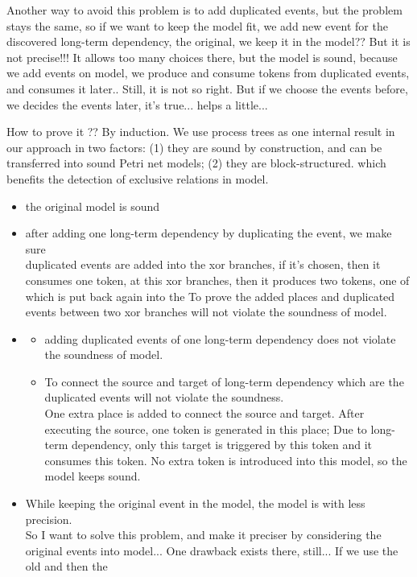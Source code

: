 Another way to avoid this problem is to add duplicated events, but the problem stays the same, so if we want to keep the model fit, we add new event for the discovered long-term dependency, the original, we keep it in the model?? But it is not precise!!! It allows too many choices there, but the model is sound, because we add events on model, we produce and consume tokens from duplicated events, and consumes it later.. Still, it is not so right. But if we choose the events before, we decides the events later, it's true... helps a little... 

How to prove it ?? By induction. 
We use  process  trees as one internal result in  our  approach in two factors: (1) they are sound by construction, and can be transferred into sound Petri net models; (2) they are block-structured. which benefits the detection of exclusive relations in model.

\begin{itemize}
	\item the original model is sound
	\item after adding one long-term dependency by duplicating the event, we make sure
	\\ duplicated events are added into the xor branches, if it's chosen, then it consumes one token, at this xor branches, then it produces two tokens, one of which is put back again into the 
	To prove the added places and duplicated events between two xor branches will not violate the soundness of model. 
	\item 
	\begin{itemize}
		\item adding duplicated events of one long-term dependency does not violate the soundness of model. 
		
		\item To connect the source and target  of long-term dependency which are the duplicated events will not violate the soundness.
		\\ One extra place is added to connect the source and target. After executing the source, one token is generated in this place; Due to long-term dependency, only this target is triggered by this token and it consumes this token. No extra token is introduced into this model, so the model keeps sound. 
		
	\end{itemize}
	
	\item While keeping the original event in the model,  the model is with less precision.  
	\\ 
	So I want to solve this problem, and make it preciser by considering the original events into model... 
	One drawback exists there, still... If we use the old and then the 
\end{itemize}

